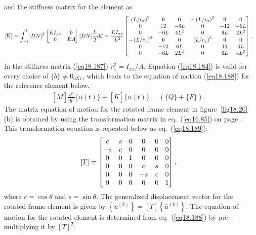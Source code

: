 \documentclass{AeroStructure-ERJohnson}
\begin{document}
and the stiffness matrix for the element as
\begin{align}\label{eq18.187}
[\overline{K}]=\int_{-1}^{1}[D N]^{T}\left[\begin{array}{@{}cc@{}}E I_{x x} & 0 \\0 & E A\end{array}\right][D N] \frac{L}{2} d \zeta=\frac{E I_{x x}}{L^{3}}\left[\begin{array}{@{}cccccc@{}}\left(L/r_{x}\right)^{2} & 0 & 0 & -\left(L/ r_{x}\right)^{2} & 0 & 0 \\0 & 12 & -6 L & 0 & -12 & -6 L \\0 & -6 L & 4 L^{2} & 0 & 6 L & 2 L^{2} \\-\left(L/r_{x}\right)^{2} & 0 & 0 & \left(L/r_{x}\right)^{2} & 0 & 0 \\0 & -12 & 6 L & 0 & 12 & 6 L \\0 & -6 L & 2 L^{2} & 0 & 6 L & 4 L^{2}\end{array}\right].
\end{align}
In the stiffness matrix (\ref{eq18.187}) $r_{x}^{2}=I_{x x}/A$. Equation (\ref{eq18.184}) is valid for every choice of $\{b\} \neq 0_{6 X 1}$, which leads to the equation of motion (\ref{eq18.188}) for the reference element below.
\begin{align}\label{eq18.188}
[\overline{M}] \frac{d^{2}}{d t^{2}}\{\bar{u}(t)\}+[\overline{K}]\{\bar{u}(t)\}=(\{Q\}+\{F\}).
\end{align}
The matrix equation of motion for the rotated frame element in figure~\ref{fig18.20}(b) is obtained by using the transformation matrix in eq.~(\ref{eq16.85}) on page \pageref{eq16.85}. This transformation equation is repeated below as eq.~(\ref{eq18.189}):
\begin{align}\label{eq18.189}
[T]=\left[\begin{array}{@{}cccccc@{}}c & s & 0 & 0 & 0 & 0 \\-s & c & 0 & 0 & 0 & 0 \\0 & 0 & 1 & 0 & 0 & 0 \\0 & 0 & 0 & c & s & 0 \\0 & 0 & 0 & -s & c & 0 \\0 & 0 & 0 & 0 & 0 & 1\end{array}\right],
\end{align}
where $c=\cos \theta$ and $s=\sin \theta$. The generalized displacement vector for the rotated frame element is given by $\left\{u^{(k)}\right\}=[T]\left\{\bar{u}^{(k)}\right\}$. The equation of motion for the rotated element is determined from eq.~(\ref{eq18.188}) by pre-multiplying it by $[T]^{T}$:
\end{document}
